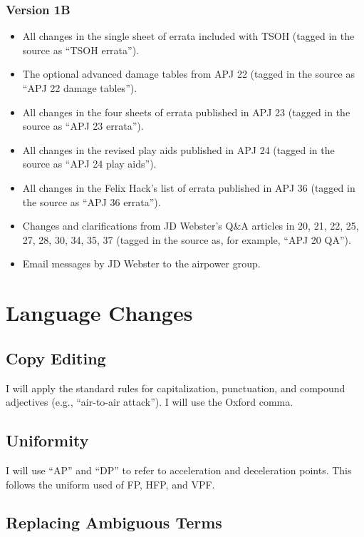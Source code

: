 \documentclass[10pt]{article}
\begin{document}
\subsubsection{Version 1B}

\begin{itemize}
    \item All changes in the single sheet of errata included with TSOH (tagged in the source as “TSOH errata”).
    \item The optional advanced damage tables from APJ 22 (tagged in the source as “APJ 22 damage tables”).
    \item All changes in the four sheets of errata published in APJ 23 (tagged in the source as “APJ 23 errata”).
    \item All changes in the revised play aids published in APJ 24 (tagged in the source as “APJ 24 play aids”).
    \item All changes in the Felix Hack's list of errata published in APJ 36 (tagged in the source as “APJ 36 errata”).
    \item Changes and clarifications from JD Webster's Q\&A articles in {\APJ} 20, 21, 22, 25, 27, 28, 30, 34, 35, 37 (tagged in the source as, for example, “APJ 20 QA”).
    \item Email messages by JD Webster to the airpower group.
    
\end{itemize}


\section{Language Changes}

\subsection{Copy Editing}

I will apply the standard rules for capitalization, punctuation, and compound adjectives (e.g., “air-to-air attack”). I will use the Oxford comma.

\subsection{Uniformity}

I will use “AP” and “DP” to refer to acceleration and deceleration points. This follows the uniform used of FP, HFP, and VPF.

\subsection{Replacing Ambiguous Terms}
\end{document}
